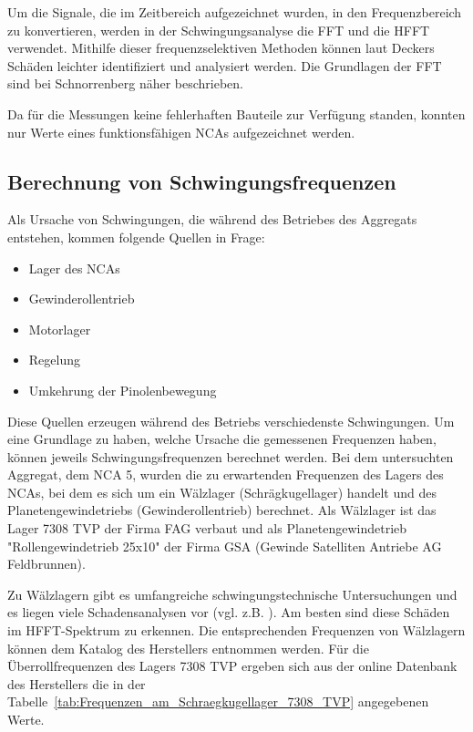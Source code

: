 Um die Signale, die im Zeitbereich aufgezeichnet wurden, in den Frequenzbereich zu konvertieren, werden in der Schwingungsanalyse die \gls{FFT} und die \gls{HFFT} verwendet. Mithilfe dieser frequenzselektiven Methoden können laut Deckers \cite{Deckers2001} Schäden leichter identifiziert und analysiert werden. Die Grundlagen der \gls{FFT} sind bei Schnorrenberg \cite{schnorrenberg1990spektrumanalyse} näher beschrieben.

Da für die Messungen keine fehlerhaften Bauteile zur Verfügung standen, konnten nur Werte eines funktionsfähigen NCAs aufgezeichnet werden.



\subsection{Berechnung von Schwingungsfrequenzen}\label{cha:Berechnung von Schwingungsfrequenzen}


Als Ursache von Schwingungen, die während des Betriebes des Aggregats entstehen, kommen folgende Quellen in Frage:

\begin{itemize}
\item Lager des NCAs
\item Gewinderollentrieb
\item Motorlager
\item Regelung
\item Umkehrung der Pinolenbewegung
\end{itemize}

    
Diese Quellen erzeugen während des Betriebs verschiedenste Schwingungen. Um eine Grundlage zu haben, welche Ursache die gemessenen Frequenzen haben, können jeweils Schwingungsfrequenzen berechnet werden. Bei dem untersuchten Aggregat, dem NCA 5, wurden die zu erwartenden Frequenzen des Lagers des NCAs, bei dem es sich um ein Wälzlager (Schrägkugellager) handelt und des Planetengewindetriebs (Gewinderollentrieb) berechnet. Als Wälzlager ist das Lager 7308 TVP der Firma FAG verbaut und als Planetengewindetrieb "Rollengewindetrieb 25x10" der Firma GSA (Gewinde Satelliten Antriebe AG Feldbrunnen).



Zu Wälzlagern  gibt es umfangreiche schwingungstechnische  Untersuchungen und es liegen viele Schadensanalysen vor (vgl. z.B. \cite{Sturm1986}).  Am besten sind diese Schäden im HFFT-Spektrum zu erkennen. Die entsprechenden Frequenzen von Wälzlagern können dem Katalog des Herstellers entnommen werden. Für die Überrollfrequenzen des Lagers 7308 TVP ergeben sich aus der online Datenbank des Herstellers die in der Tabelle~\ref{tab:Frequenzen_am_Schraegkugellager_7308_TVP} angegebenen Werte. 

